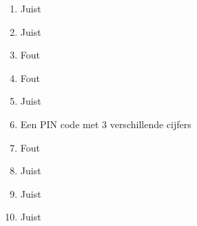 \begin{enumerate}
  \item Juist
  \item Juist
  \item Fout
  \item Fout
  \item Juist
  \item Een PIN code met 3 verschillende cijfers
  \item Fout
  \item Juist
  \item Juist
  \item Juist
\end{enumerate}